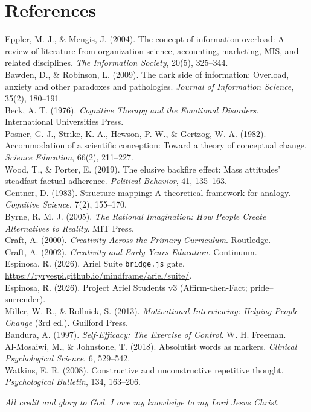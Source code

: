 \documentclass[11pt, a4paper]{article}
\begin{document}
\section*{References}
\noindent [1] Eppler, M. J., \& Mengis, J. (2004). The concept of information overload: A review of literature from organization science, accounting, marketing, MIS, and related disciplines. \textit{The Information Society}, 20(5), 325--344.\\
\noindent [2] Bawden, D., \& Robinson, L. (2009). The dark side of information: Overload, anxiety and other paradoxes and pathologies. \textit{Journal of Information Science}, 35(2), 180--191.\\
\noindent [3] Beck, A. T. (1976). \textit{Cognitive Therapy and the Emotional Disorders}. International Universities Press.\\
\noindent [4] Posner, G. J., Strike, K. A., Hewson, P. W., \& Gertzog, W. A. (1982). Accommodation of a scientific conception: Toward a theory of conceptual change. \textit{Science Education}, 66(2), 211--227.\\
\noindent [5] Wood, T., \& Porter, E. (2019). The elusive backfire effect: Mass attitudes' steadfast factual adherence. \textit{Political Behavior}, 41, 135--163.\\
\noindent [6] Gentner, D. (1983). Structure-mapping: A theoretical framework for analogy. \textit{Cognitive Science}, 7(2), 155--170.\\
\noindent [7] Byrne, R. M. J. (2005). \textit{The Rational Imagination: How People Create Alternatives to Reality}. MIT Press.\\
\noindent [8] Craft, A. (2000). \textit{Creativity Across the Primary Curriculum}. Routledge.\\
\noindent [9] Craft, A. (2002). \textit{Creativity and Early Years Education}. Continuum.\\
\noindent [10] Espinosa, R. (2026). Ariel Suite \texttt{bridge.js} gate. \url{https://ryryespi.github.io/mindframe/ariel/suite/}.\\
\noindent [11] Espinosa, R. (2026). Project Ariel Students v3 (Affirm-then-Fact; pride--surrender).\\
\noindent [12] Miller, W. R., \& Rollnick, S. (2013). \textit{Motivational Interviewing: Helping People Change} (3rd ed.). Guilford Press.\\
\noindent [13] Bandura, A. (1997). \textit{Self-Efficacy: The Exercise of Control}. W. H. Freeman.\\
\noindent [14] Al-Mosaiwi, M., \& Johnstone, T. (2018). Absolutist words as markers. \textit{Clinical Psychological Science}, 6, 529--542.\\
\noindent [15] Watkins, E. R. (2008). Constructive and unconstructive repetitive thought. \textit{Psychological Bulletin}, 134, 163--206.

\vspace{1.1em}
\noindent\textit{All credit and glory to God. I owe my knowledge to my Lord Jesus Christ.}
\end{document}
